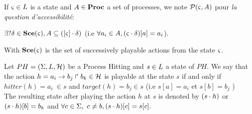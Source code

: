 \begin{definition}
\label{def:reachability}

 If $\varsigma \in L$ is a state and $A \in \mathbf{Proc}$ a set of processes, we note $\mathcal{P}(\varsigma, A)$ pour \emph{la question d'accessibilité}:
 \begin{center}
  $\exists? \delta \in \mathbf{Sce}(\varsigma), A \subseteq {([\varsigma]} \cdot \delta) $ (i.e $\forall a_i \in A, {(\varsigma \cdot \delta)[a]}=a_i$).
 \end{center}
With $\mathbf{Sce}(\varsigma)$ 
is the set of successively playable actions from the state $\varsigma$. 
\end{definition}

\begin{definition} 
\label{def:playableAction}
Let $PH = (\Sigma,L,\mathcal{H})$ be a Process Hitting and $s \in L$ a state of $PH$. We say that the action $h = a_i\rightarrow b_j\Rsh b_k \in \mathcal{H}$ is playable at the state $s$ if and only if $hitter(h)=a_i ~ \in s$ and $target(h)=b_j \in s$ (i.e $s[a]=a_i$ et $s[b]=b_j$ ) \\
The resulting state after playing the action $h$ at $s$ is denoted by $(s \cdot h)$ or $(s \cdot h)[b]=b_k$ and $\forall c \in \Sigma, ~ c \neq b, (s \cdot h)[c]=s[c].$
\end{definition}
